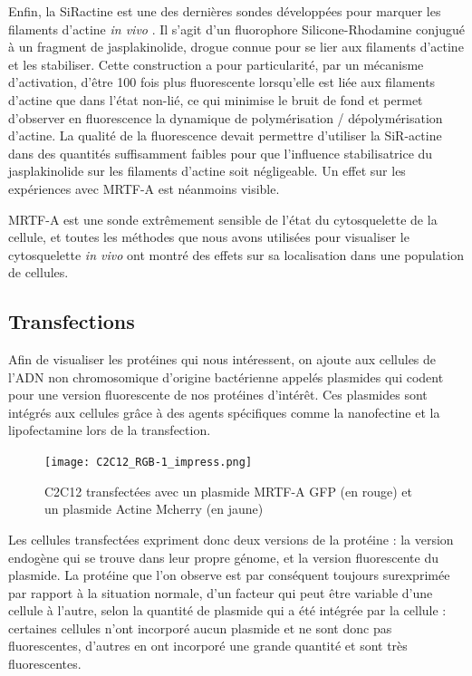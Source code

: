 Enfin, la SiRactine est une des dernières sondes développées pour marquer les filaments d'actine \textit{in vivo} \parencite{lukinavicius_fluorogenic_2014}. Il s'agit d'un fluorophore Silicone-Rhodamine conjugué à un fragment de jasplakinolide, drogue connue pour se lier aux filaments d'actine et les stabiliser. Cette construction a pour particularité, par un mécanisme d'activation, d'être 100 fois plus fluorescente lorsqu'elle est liée aux filaments d'actine que dans l'état non-lié, ce qui minimise le bruit de fond et permet d’observer en fluorescence la dynamique de polymérisation / dépolymérisation d’actine. La qualité de la fluorescence devait permettre d'utiliser la SiR-actine dans des quantités suffisamment faibles pour que l'influence stabilisatrice du jasplakinolide sur les filaments d'actine soit négligeable. Un effet sur les expériences avec MRTF-A est néanmoins visible. 

MRTF-A est une sonde extrêmement sensible de l'état du cytosquelette de la cellule, et toutes les méthodes que nous avons utilisées pour visualiser le cytosquelette \textit{in vivo} ont montré des effets sur sa localisation dans une population de cellules. 
	
	
	\subsection{Transfections}
	Afin de visualiser les protéines qui nous intéressent, on ajoute aux cellules de l'ADN non chromosomique d'origine bactérienne appelés plasmides qui codent pour une version fluorescente de nos protéines d'intérêt. Ces plasmides sont intégrés aux cellules grâce à des agents spécifiques comme la nanofectine et la lipofectamine lors de la transfection. 
	
	\begin{figure}
	\texttt{[image: C2C12\_RGB-1\_impress.png]}
	\caption{C2C12 transfectées avec un plasmide MRTF-A GFP (en rouge) et un plasmide Actine Mcherry (en jaune)}
	\end{figure}
	
	Les cellules transfectées expriment donc deux versions de la protéine : la version endogène qui se trouve dans leur propre génome, et la version fluorescente du plasmide. La protéine que l'on observe est par conséquent toujours surexprimée par rapport à la situation normale, d'un facteur qui peut être variable d'une cellule à l'autre, selon la quantité de plasmide qui a été intégrée par la cellule : certaines cellules n'ont incorporé aucun plasmide et ne sont donc pas fluorescentes, d'autres en ont incorporé une grande quantité et sont très fluorescentes. 
	
